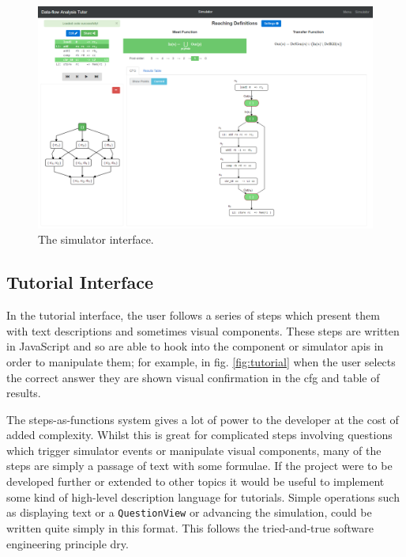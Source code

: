 \documentclass[bsc,twoside,singlespacing,parskip,logo,notimes,normalheadings]{infthesis}
\begin{document}
        \begin{figure}[p]
          \centering
          \includegraphics[width=\textheight, angle=-90]{img/simulator.png}
          \captionsetup{width=\textwidth, justification=centering}
          \caption{The simulator interface.}\label{fig:simulator}
        \end{figure}

        \vspace{-4mm}
        \subsection{Tutorial Interface}\label{sec:impl-tutorials}
        \vspace{-3mm}        
        In the tutorial interface, the user follows a series of steps
        which present them with text descriptions and sometimes visual
        components. These steps are written in JavaScript and so are
        able to hook into the component or simulator \gls{api}s in
        order to manipulate them; for example, in
        fig. \ref{fig:tutorial} when the user selects the correct
        answer they are shown visual confirmation in the \gls{cfg} and
        table of results.

        The steps-as-functions system gives a lot of power to the
        developer at the cost of added complexity. Whilst this is
        great for complicated steps involving questions which trigger
        simulator events or manipulate visual components, many of the
        steps are simply a passage of text with some formulae. If the
        project were to be developed further or extended to other
        topics it would be useful to implement some kind of high-level
        description language for tutorials. Simple operations such as
        displaying text or a {\tt QuestionView} or advancing the
        simulation, could be written quite simply in this format. This
        follows the tried-and-true software engineering principle
        \gls{dry}.
\end{document}
